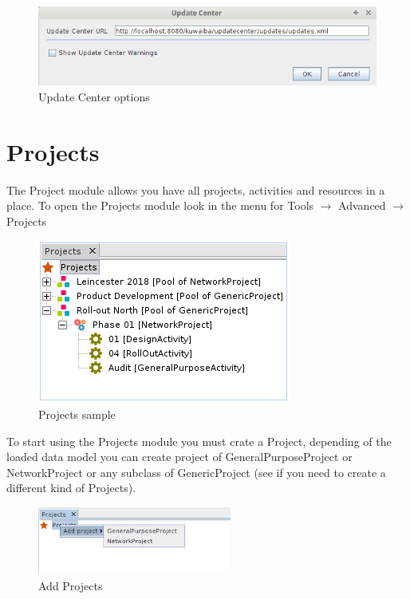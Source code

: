 \documentclass[a4paper]{article}
\begin{document}
		\begin{figure}[h!]
			\centering
			\includegraphics[width=0.7\linewidth]{img/update_center.png}
			\caption{Update Center options}
			\label{fig:update_center_options}
		\end{figure}		
		
		\newpage		
		\section{Projects}\label{sec:projects}
		
			The Project module allows you have all projects, activities and resources in a place. To open the Projects module look in the menu for Tools $\rightarrow$ Advanced $\rightarrow$ Projects
			\newline
			
			\begin{figure}[h!]
				\centering
				\includegraphics[width=0.5\linewidth]{img/projects.png}
				\caption{Projects sample}
				\label{fig:projects}
		    \end{figure}
		    
		    To start using the Projects module you must crate a Project, depending of the loaded data model you can create project of GeneralPurposeProject or NetworkProject or any subclass of GenericProject (see \textbf{} if you need to create a different kind  of Projects).
		    \newline
		    
		    \begin{figure}[h!]
		    	\centering
		    	\includegraphics[width=0.5\linewidth]{img/projects_actions.png}
		    	\caption{Add Projects}	    
		    	\label{fig:projects_actions}
		    \end{figure}
		    
\end{document}
